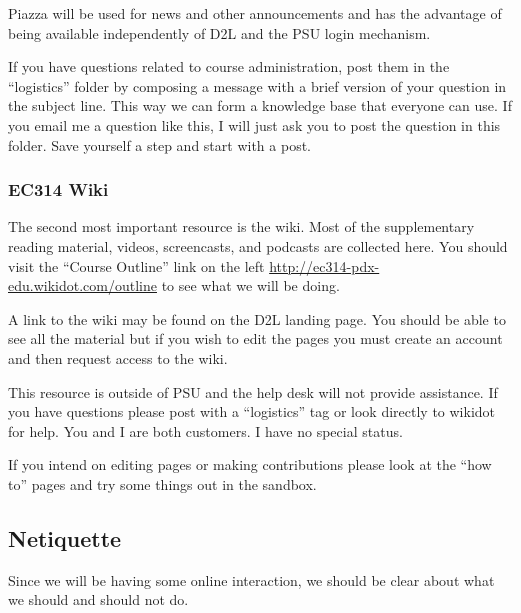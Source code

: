 \documentclass[letterpaper,10pt]{article}
\begin{document}
Piazza will be used for news and other announcements and has the advantage of being available independently of D2L and the PSU login mechanism.  

If you have questions related to course administration, post them in
the ``logistics'' folder by
composing a message with a brief version of your question in the
subject line. This way we can form a knowledge base that everyone can
use.  If you email me a question like this, I will just ask you to
post the question in this folder.  Save yourself a step and start with a post.



\subsubsection{EC314 Wiki}
The second most important resource is the wiki.  Most of the
supplementary reading material, videos, screencasts, and podcasts are
collected here. You should visit the ``Course Outline'' link on the
left \url{http://ec314-pdx-edu.wikidot.com/outline} to see what we will be
doing.

A link to the wiki may be found on the D2L landing page.  You should
be able to see all the material but if you wish to edit the pages you
must create an account and then request access to the wiki.

This resource is outside of PSU and the help desk will not provide
assistance.  If you have questions please post with a  
``logistics'' tag or look directly to wikidot
for help.  You and I are both customers. I have no special status.

If you intend on editing pages or making contributions please look at
the ``how to'' pages and try some things out in the sandbox.

\subsection{Netiquette}
Since we will be having some online interaction, we should be clear
about what we should and should not do.
\end{document}
